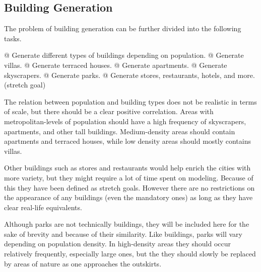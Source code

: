 \subsection{Building Generation}

The problem of building generation can be further divided into the following tasks.

\begin{easylist}
  @ Generate different types of buildings depending on population.
  @ Generate villas.
  @ Generate terraced houses.
  @ Generate apartments.
  @ Generate skyscrapers.
  @ Generate parks.
  @ Generate stores, restaurants, hotels, and more. (stretch goal)
\end{easylist}

The relation between population and building types does not be realistic in
terms of scale, but there should be a clear positive correlation.
Areas with metropolitan-levels of population should have a high frequency of skyscrapers, apartments, and other tall buildings.
Medium-density areas should contain apartments and terraced houses, while low
density areas should mostly contains villas.

Other buildings such as stores and restaurants would help enrich the cities with
more variety, but they might require a lot of time spent on modeling.
Because of this they have been defined as stretch goals.
However there are no restrictions on the appearance of any buildings (even the
mandatory ones) as long as they have clear real-life equivalents.

Although parks are not technically buildings, they will be included here for the
sake of brevity and because of their similarity.
Like buildings, parks will vary depending on population density.
In high-density areas they should occur relatively frequently, especially large
ones, but the they should slowly be replaced by areas of nature as one approaches the outskirts.